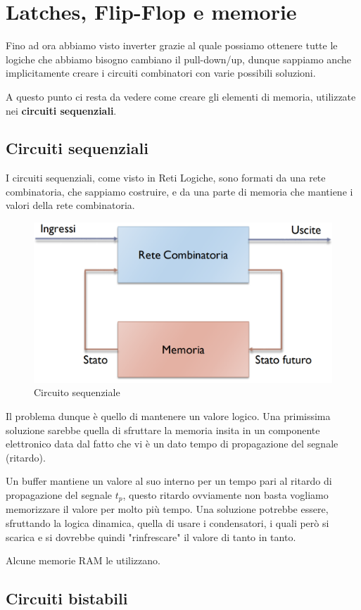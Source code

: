 \chapter{Latches, Flip-Flop e memorie}

Fino ad ora abbiamo visto inverter grazie al quale possiamo ottenere tutte le logiche che abbiamo bisogno cambiano il pull-down/up, dunque sappiamo anche implicitamente creare i circuiti combinatori con varie possibili soluzioni.

A questo punto ci resta da vedere come creare gli elementi di memoria, utilizzate nei \textbf{circuiti sequenziali}.

\section{Circuiti sequenziali}

I circuiti sequenziali, come visto in Reti Logiche, sono formati da una rete combinatoria, che sappiamo costruire, e da una parte di memoria che mantiene i valori della rete combinatoria.

\begin{figure}[htbp]
    \centering
    \includegraphics[width=0.5\linewidth]{img/circ_seq.png}
    \caption{Circuito sequenziale}    
\end{figure}

Il problema dunque è quello di mantenere un valore logico. Una primissima soluzione sarebbe quella di sfruttare la memoria insita in un componente elettronico data dal fatto che vi è un dato tempo di propagazione del segnale (ritardo).

Un buffer mantiene un valore al suo interno per un tempo pari al ritardo di propagazione del segnale $t_p$, questo ritardo ovviamente non basta vogliamo memorizzare il valore per molto più tempo. Una soluzione potrebbe essere, sfruttando la logica dinamica, quella di usare i condensatori, i quali però si scarica e si dovrebbe quindi "rinfrescare" il valore di tanto in tanto.

Alcune memorie RAM le utilizzano.

\section{Circuiti bistabili}

